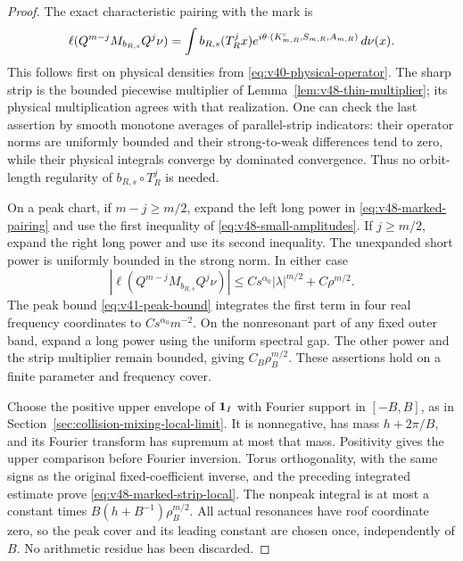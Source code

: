 \begin{proof}
The exact characteristic pairing with the mark is
\begin{equation}\label{eq:v48-marked-pairing}
 \ell(Q^{m-j}M_{b_{R,s}}Q^j\nu)
   =\int b_{R,s}(T_R^jx)
      e^{i\theta\cdot(K^{\rm c}_{m,R},S_{m,R},A_{m,R})}\,d\nu(x).
\end{equation}
This follows first on physical densities from
\eqref{eq:v40-physical-operator}. The sharp strip is the bounded
piecewise multiplier of Lemma~\ref{lem:v48-thin-multiplier}; its
physical multiplication agrees with that realization. One can check
the last assertion by smooth monotone averages of parallel-strip
indicators: their operator norms are uniformly bounded and their
strong-to-weak differences tend to zero, while their physical
integrals converge by dominated convergence. Thus no orbit-length
regularity of $b_{R,s}\circ T_R^j$ is needed.

On a peak chart, if $m-j\ge m/2$, expand the left long power in
\eqref{eq:v48-marked-pairing} and use the first inequality of
\eqref{eq:v48-small-amplitudes}. If $j\ge m/2$, expand the right
long power and use its second inequality. The unexpanded short power
is uniformly bounded in the strong norm. In either case
\[
 |\ell(Q^{m-j}M_{b_{R,s}}Q^j\nu)|
       \le Cs^{\alpha_0}|\lambda|^{m/2}+C\rho^{m/2}.
\]
The peak bound \eqref{eq:v41-peak-bound} integrates the first term
in four real frequency coordinates to $Cs^{\alpha_0}m^{-2}$.
On the nonresonant part of any fixed outer band, expand a long power
using the uniform spectral gap. The other power and the strip
multiplier remain bounded, giving $C_B\rho_B^{m/2}$.
These assertions hold on a finite parameter and frequency cover.

Choose the positive upper envelope of $\mathbf1_I$ with Fourier support
in $[-B,B]$, as in Section~\ref{sec:collision-mixing-local-limit}.
It is nonnegative, has mass $h+2\pi/B$, and its Fourier transform
has supremum at most that mass. Positivity gives the upper comparison
before Fourier inversion. Torus orthogonality, with the same signs
as the original fixed-coefficient inverse, and the preceding
integrated estimate prove \eqref{eq:v48-marked-strip-local}.
The nonpeak integral is at most a constant times
$B(h+B^{-1})\rho_B^{m/2}$. All actual resonances have roof coordinate
zero, so the peak cover and its leading constant are chosen once,
independently of $B$. No arithmetic residue has been discarded.
\end{proof}

